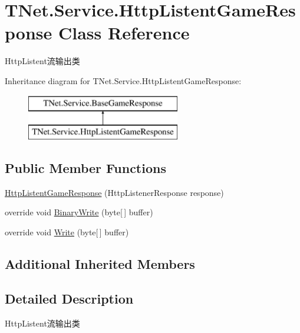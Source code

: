 \hypertarget{class_t_net_1_1_service_1_1_http_listent_game_response}{}\section{T\+Net.\+Service.\+Http\+Listent\+Game\+Response Class Reference}
\label{class_t_net_1_1_service_1_1_http_listent_game_response}


Http\+Listent流输出类  


Inheritance diagram for T\+Net.\+Service.\+Http\+Listent\+Game\+Response\+:\begin{figure}[H]
\begin{center}
\leavevmode
\includegraphics[height=2.000000cm]{class_t_net_1_1_service_1_1_http_listent_game_response}
\end{center}
\end{figure}
\subsection*{Public Member Functions}
\begin{DoxyCompactItemize}
\item 
\mbox{\hyperlink{class_t_net_1_1_service_1_1_http_listent_game_response_a71bf7772849cdca097724733dd6e4bcf}{Http\+Listent\+Game\+Response}} (Http\+Listener\+Response response)
\item 
override void \mbox{\hyperlink{class_t_net_1_1_service_1_1_http_listent_game_response_ac7b76407d3675d404c1a9079c168e4cb}{Binary\+Write}} (byte\mbox{[}$\,$\mbox{]} buffer)
\item 
override void \mbox{\hyperlink{class_t_net_1_1_service_1_1_http_listent_game_response_ae8d535287fff26bbf1face8058daec22}{Write}} (byte\mbox{[}$\,$\mbox{]} buffer)
\end{DoxyCompactItemize}
\subsection*{Additional Inherited Members}


\subsection{Detailed Description}
Http\+Listent流输出类 



